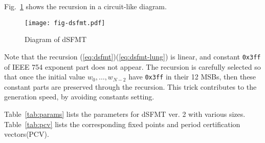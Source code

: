 \documentclass{svmult}
\begin{document}
Fig.~\ref{fig:dsfmt} shows the recursion in a circuit-like diagram.

\begin{figure}
  \begin{center}
    \texttt{[image: fig-dsfmt.pdf]}
    \caption{Diagram of dSFMT}
    \label{fig:dsfmt}
  \end{center}
\end{figure}

Note that the recursion (\ref{eq:dsfmt})(\ref{eq:dsfmt-lung})
is linear, and constant \texttt{0x3ff} of IEEE 754 exponent part
does not appear.
The recursion is carefully selected so that once
the initial value $w_0,\ldots , w_{N-2}$ have \texttt{0x3ff} in their 12 MSBs,
then these constant parts are preserved through the recursion. 
This trick contributes to the generation speed, by avoiding
constants setting.

Table~\ref{tab:params} lists the parameters 
for dSFMT ver. 2 with various sizes.
Table~\ref{tab:pcv} lists the corresponding fixed points and period
certification vectors(PCV).

\end{document}

